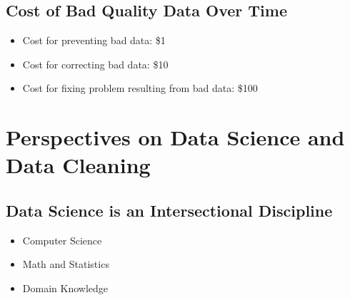 \documentclass[11pt]{article}
\theoremstyle{definition}
\begin{document}
\subsection{Cost of Bad Quality Data Over Time}
\begin{itemize}
    \item Cost for preventing bad data: \$1
    \item Cost for correcting bad data: \$10
    \item Cost for fixing problem resulting from bad data: \$100
\end{itemize}

\section{Perspectives on Data Science
and Data Cleaning}
\subsection{Data Science is an Intersectional Discipline}
\begin{itemize}
    \item Computer Science
    \item Math and Statistics
    \item Domain Knowledge
\end{itemize}
\end{document}
